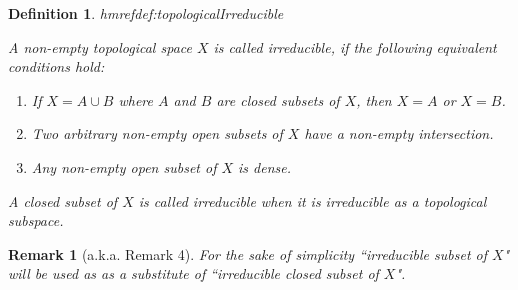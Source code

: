 \documentclass[DIV=14,parskip=full,pointednumbers]{scrartcl}
\newenvironment{alphanumerate}{\begin{enumerate}[label={\upshape(\alph*)}]}{\end{enumerate}}
\theoremstyle{cthm}
\theoremstyle{cvarthm}
\theoremstyle{cdef}
\newtheorem{defi}{Definition}[subsection]
\newtheorem{rem}{Remark}[subsection]
\newcommand{\lbl}[1]{
	\label{#1}
	\edef\dummy{\curthm}
	\expandafter\xdef\csname thmref#1\endcsname{\dummy}
}
\begin{document}
\begin{defi}\lbl{def:topologicalIrreducible}
 A non-empty topological space $X$ is called \emph{irreducible},  if the following equivalent conditions hold:
 \begin{alphanumerate}
  \item If $X=A\cup B$ where $A$ and $B$ are closed subsets of $X$, then $X=A$ or $X=B$. 
  \item Two arbitrary non-empty open subsets of $X$ have a non-empty intersection.
  \item Any non-empty open subset of $X$ is dense.
 \end{alphanumerate}
A closed subset of $X$ is called irreducible when it is irreducible as a topological subspace.
\end{defi}
\begin{rem}[a.k.a. Remark 4]
 For the sake of simplicity ``irreducible subset of $X$" will be used as as a substitute of ``irreducible closed subset of $X$".
\end{rem}
\end{document}
